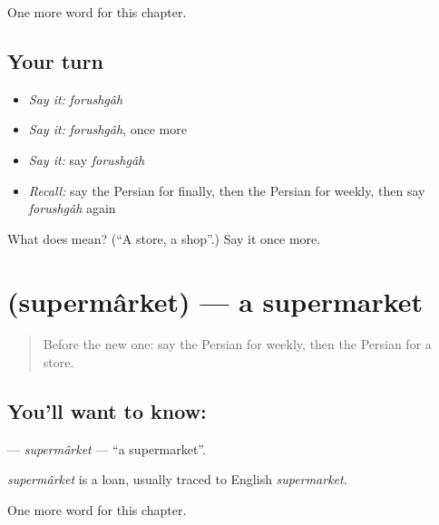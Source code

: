 \begin{grammarlens}[title={What you've built}]
One more word for this chapter.
\end{grammarlens}

\subsection*{Your turn}
\begin{itemize}
\raggedright
  \item \emph{Say it:} \emph{forushgâh}
  \item \emph{Say it:} \emph{forushgâh}, once more
  \item \emph{Say it:} say \emph{forushgâh}
  \item \emph{Recall:} say the Persian for finally, then the Persian for weekly, then say \emph{forushgâh} again
\end{itemize}

\begin{tcolorbox}[breakable,colback=teal!4,colframe=teal!35!black,title={Before you move on}]
What does  mean? (\textquotedblleft{}A store, a shop\textquotedblright{}.) Say it once more.
\end{tcolorbox}
\section[\texorpdfstring{\fa{سوپرمارکت} (supermârket)}{سوپرمارکت (supermârket)}]{ (supermârket) — a supermarket}

\label{lesson:FA-C154-supermarket}



\begin{quote}
Before the new one: say the Persian for weekly, then the Persian for a store.
\end{quote}

\subsection*{You'll want to know: }
\textbf{} — \emph{supermârket} — \textquotedblleft{}a supermarket\textquotedblright{}.

\begin{cousinweb}
\emph{supermârket} is a loan, usually traced to English \emph{supermarket}.
\end{cousinweb}

\begin{grammarlens}[title={What you've built}]
One more word for this chapter.
\end{grammarlens}

